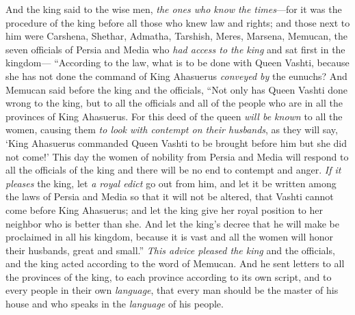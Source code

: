 \begin{biblechapter}
\verse And the king said to the wise men, \textit{the ones who know the times}—for it was the procedure of the king before all those who knew law and rights;
\verse and those next to him were Carshena, Shethar, Admatha, Tarshish, Meres, Marsena, Memucan, the seven officials of Persia and Media who \textit{had access to the king} and sat first in the kingdom—
\verse “According to the law, what is to be done with Queen Vashti, because she has not done the command of King Ahasuerus \textit{conveyed by} the eunuchs?
\verse And Memucan said before the king and the officials, “Not only has Queen Vashti done wrong to the king, but to all the officials and all of the people who are in all the provinces of King Ahasuerus.
\verse For this deed of the queen \textit{will be known} to all the women, causing them \textit{to look with contempt on their husbands}, as they will say, ‘King Ahasuerus commanded Queen Vashti to be brought before him but she did not come!’
\verse This day the women of nobility from Persia and Media will respond to all the officials of the king and there will be no end to contempt and anger.
\verse \textit{If it pleases} the king, let \textit{a royal edict} go out from him, and let it be written among the laws of Persia and Media so that it will not be altered, that Vashti cannot come before King Ahasuerus; and let the king give her royal position to her neighbor who is better than she.
\verse And let the king’s decree that he will make be proclaimed in all his kingdom, because it is vast and all the women will honor their husbands, great and small.”
\verse \textit{This advice pleased the king} and the officials, and the king acted according to the word of Memucan.
\verse And he sent letters to all the provinces of the king, to each province according to its own script, and to every people in their own \textit{language}, that every man should be the master of his house and who speaks in the \textit{language} of his people.
\end{biblechapter}


